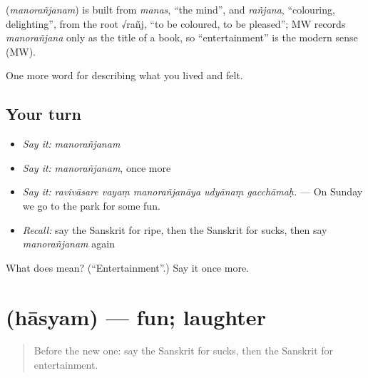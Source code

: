 \begin{cousinweb}
\textbf{} (\emph{manorañjanam}) is built from \emph{manas}, \textquotedblleft{}the mind\textquotedblright{}, and \emph{rañjana}, \textquotedblleft{}colouring, delighting\textquotedblright{}, from the root √rañj, \textquotedblleft{}to be coloured, to be pleased\textquotedblright{}; MW records \emph{manorañjana} only as the title of a book, so \textquotedblleft{}entertainment\textquotedblright{} is the modern sense (MW).
\end{cousinweb}

\begin{grammarlens}[title={What you've built}]
One more word for describing what you lived and felt.
\end{grammarlens}

\subsection*{Your turn}
\begin{itemize}
\raggedright
  \item \emph{Say it:} \emph{manorañjanam}
  \item \emph{Say it:} \emph{manorañjanam}, once more
  \item \emph{Say it:} \emph{ravivāsare vayaṃ manorañjanāya udyānaṃ gacchāmaḥ.} — On Sunday we go to the park for some fun.
  \item \emph{Recall:} say the Sanskrit for ripe, then the Sanskrit for sucks, then say \emph{manorañjanam} again
\end{itemize}

\begin{tcolorbox}[breakable,colback=teal!4,colframe=teal!35!black,title={Before you move on}]
What does  mean? (\textquotedblleft{}Entertainment\textquotedblright{}.) Say it once more.
\end{tcolorbox}
\section[\texorpdfstring{\sk{हास्यम्} (hāsyam)}{हास्यम् (hāsyam)}]{ (hāsyam) — fun; laughter}

\label{lesson:SA-C516-hasyam}



\begin{quote}
Before the new one: say the Sanskrit for sucks, then the Sanskrit for entertainment.
\end{quote}

